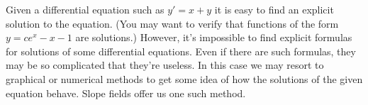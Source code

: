 \documentclass{ximera}
\begin{document}
\begin{question}
% 

\end{question}


Given a differential equation such as $y'=x+y$ it is easy to find an explicit solution to the equation.  (You may want to verify that functions of the form $y=ce^x-x-1$ are solutions.)  However, it's impossible to find explicit formulas for solutions of some
differential equations. Even if there are such  formulas, they may be
so complicated that they're useless. In this case we may resort to
graphical or numerical methods to get some idea of how the solutions
of the given equation behave. Slope fields offer us one such method.

\end{document}
